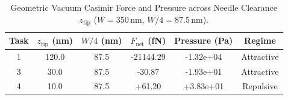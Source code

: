 \begin{table}[htbp]
\centering
\caption{Geometric Vacuum Casimir Force and Pressure across Needle Clearance $z_{\text{tip}}$ ($W = 350\,\text{nm}$, $W/4 = 87.5\,\text{nm}$).}
\label{tab:geometric_repulsion}
\begin{tabular}{cccccc}
\hline
Task & $z_{\text{tip}}$ (nm) & $W/4$ (nm) & $F_{\text{net}}$ (fN) & Pressure (Pa) & Regime \\
\hline
1 & 120.0 & 87.5 & -21144.29 & -1.32e+04 & Attractive \\
3 & 30.0 & 87.5 & -30.87 & -1.93e+01 & Attractive \\
4 & 10.0 & 87.5 & +61.20 & +3.83e+01 & Repulsive \\
\hline
\end{tabular}
\end{table}
